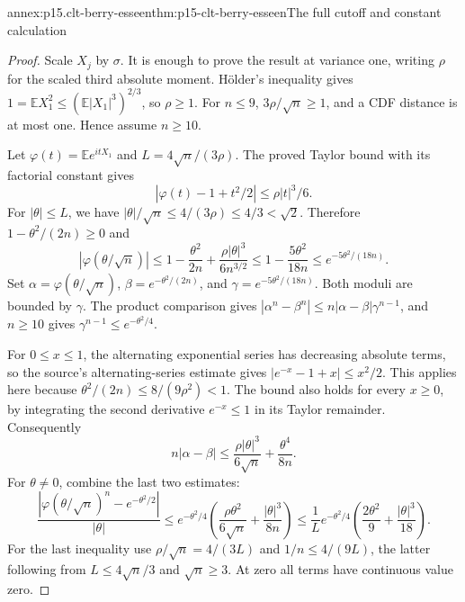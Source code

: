 \begin{annexitem}{annex:p15.clt-berry-esseen}{thm:p15-clt-berry-esseen}{The full cutoff and constant calculation}
\begin{proof}
Scale \(X_j\) by \(\sigma\). It is enough to prove the result
at variance one, writing \(\rho\) for the scaled third absolute
moment. Hölder's inequality gives
\(1=\mathbb EX_1^2\leq(\mathbb E|X_1|^3)^{2/3}\), so
\(\rho\geq1\). For \(n\leq9\), \(3\rho/\sqrt n\geq1\),
and a CDF distance is at most one. Hence assume \(n\geq10\).

Let \(\varphi(t)=\mathbb Ee^{itX_1}\) and
\(L=4\sqrt n/(3\rho)\).
The proved Taylor bound with its factorial constant gives
\[
 |\varphi(t)-1+t^2/2|\leq\rho|t|^3/6.
 \]
For \(|\theta|\leq L\), we have
\(|\theta|/\sqrt n\leq4/(3\rho)\leq4/3<\sqrt2\).
Therefore \(1-\theta^2/(2n)\geq0\) and
\[
 |\varphi(\theta/\sqrt n)|
 \leq1-\frac{\theta^2}{2n}
                  +\frac{\rho|\theta|^3}{6n^{3/2}}
 \leq1-\frac{5\theta^2}{18n}
 \leq e^{-5\theta^2/(18n)}.
 \]
Set
\(\alpha=\varphi(\theta/\sqrt n)\),
\(\beta=e^{-\theta^2/(2n)}\), and
\(\gamma=e^{-5\theta^2/(18n)}\).
Both moduli are bounded by \(\gamma\). The product comparison
gives \(|\alpha^n-\beta^n|\leq n|\alpha-\beta|\gamma^{n-1}\),
and \(n\geq10\) gives
\(\gamma^{n-1}\leq e^{-\theta^2/4}\).

For \(0\leq x\leq1\), the alternating exponential series has
decreasing absolute terms, so the source's alternating-series
estimate gives \(|e^{-x}-1+x|\leq x^2/2\).
This applies here because
\(\theta^2/(2n)\leq8/(9\rho^2)<1\).
The bound also holds for every \(x\geq0\), by integrating
the second derivative \(e^{-x}\leq1\) in its Taylor remainder.
Consequently
\[
 n|\alpha-\beta|
 \leq\frac{\rho|\theta|^3}{6\sqrt n}+\frac{\theta^4}{8n}.
 \]
For \(\theta\ne0\), combine the last two estimates:
\[
 \frac{|\varphi(\theta/\sqrt n)^n-e^{-\theta^2/2}|}{|\theta|}
 \leq e^{-\theta^2/4}
       \left(\frac{\rho\theta^2}{6\sqrt n}
                         +\frac{|\theta|^3}{8n}\right)
 \leq\frac1L e^{-\theta^2/4}
                      \left(\frac{2\theta^2}{9}
                                      +\frac{|\theta|^3}{18}\right).
 \]
For the last inequality use \(\rho/\sqrt n=4/(3L)\) and
\(1/n\leq4/(9L)\), the latter following from
\(L\leq4\sqrt n/3\) and \(\sqrt n\geq3\).
At zero all terms have continuous value zero.


\end{proof}
\end{annexitem}
